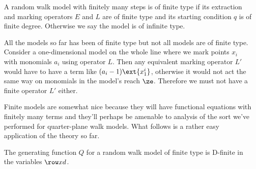 \begin{definition} A random walk model with finitely many steps is of finite type if its extraction and marking operators $E$ and $L$ are of finite type and its starting condition $q$ is of finite degree. Otherwise we say the model is of infinite type.
\end{definition}
\begin{example} All the models so far has been of finite type but not all models are of finite type. Consider a one-dimensional model on the whole line where we mark points $x_i$ with monomials $a_i$ using operator $L$. Then any equivalent marking operator $L'$ would have to have a term like $(a_i-1)\ext{x_1^i}$, otherwise it would not act the same way on monomials in the model's reach $\ze$. Therefore we must not have a finite operator $L'$ either.
\end{example}
Finite models are somewhat nice because they will have functional equations with finitely many terms and they'll perhaps be amenable to analysis of the sort we've performed for quarter-plane walk models. What follows is a rather easy application of the theory so far.
\begin{theorem} The generating function $Q$ for a random walk model of finite type is D-finite in the variables $\row xd$.
\end{theorem}
